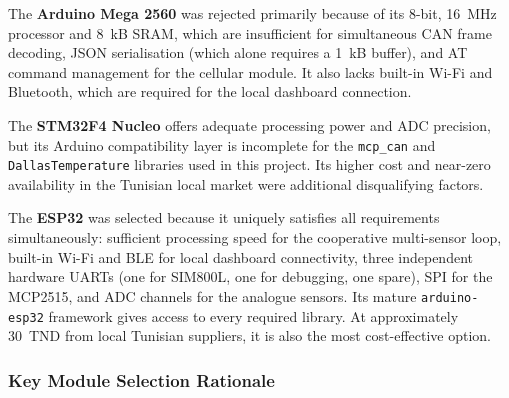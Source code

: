 The \textbf{Arduino Mega 2560} was rejected primarily because of its 8-bit, 16~MHz processor and 8~kB SRAM, which are insufficient for simultaneous CAN frame decoding, JSON serialisation (which alone requires a 1~kB buffer), and AT command management for the cellular module. It also lacks built-in Wi-Fi and Bluetooth, which are required for the local dashboard connection.

The \textbf{STM32F4 Nucleo} offers adequate processing power and ADC precision, but its Arduino compatibility layer is incomplete for the \texttt{mcp\_can} and \texttt{DallasTemperature} libraries used in this project. Its higher cost and near-zero availability in the Tunisian local market were additional disqualifying factors.

The \textbf{ESP32} was selected because it uniquely satisfies all requirements simultaneously: sufficient processing speed for the cooperative multi-sensor loop, built-in Wi-Fi and BLE for local dashboard connectivity, three independent hardware UARTs (one for SIM800L, one for debugging, one spare), SPI for the MCP2515, and ADC channels for the analogue sensors. Its mature \texttt{arduino-esp32} framework gives access to every required library. At approximately 30~TND from local Tunisian suppliers, it is also the most cost-effective option.

\subsubsection*{Key Module Selection Rationale}

